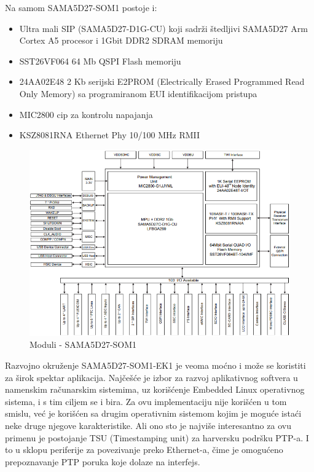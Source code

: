 \documentclass[a4paper,12pt, master]{etf}
\begin{document}
	Na samom SAMA5D27-SOM1 postoje i:
	\begin{itemize}
		\item Ultra mali SIP (SAMA5D27-D1G-CU) koji sadr\v{z}i \v{s}tedljivi 
		SAMA5D27 Arm Cortex A5 procesor i 1Gbit DDR2 SDRAM memoriju
		\item SST26VF064 64 Mb QSPI Flash memoriju
		\item 24AA02E48 2 Kb serijski E2PROM (Electrically Erased Programmed 
		Read Only Memory) sa programiranom EUI identifikacijom pristupa
		\item MIC2800 cip za kontrolu napajanja
		\item KSZ8081RNA Ethernet Phy 10/100 MHz RMII
	\end{itemize}

	\begin{figure}[htb]
			\centering
			\includegraphics[scale=.5]{../pic/hw_som_modules.PNG}
			\caption{Moduli - SAMA5D27-SOM1}
			\label{fig:hw_som_modules}
	\end{figure}

	Razvojno okru\v{z}enje SAMA5D27-SOM1-EK1 je veoma mo\'{c}no i mo\v{z}e se 
	koristiti za \v{s}irok spektar aplikacija. Naj\v{c}e\v{s}\'{c}e je izbor za 
	razvoj aplikativnog softvera u namenskim ra\v{c}unarskim sistemima, uz 
	kori\v{s}\'{c}enje Embedded Linux operativnog sistema, i s tim ciljem se i 
	bira. Za ovu implementaciju nije kori\v{s}\'{c}en u tom smislu,	ve\'{c} je 
	kori\v{s}\'{c}en sa drugim operativnim sistemom kojim je mogu\'{c}e 
	ista\'{c}i neke druge njegove karakteristike. Ali ono sto je najvi\v{s}e 
	interesantno za ovu primenu je postojanje TSU (Timestamping unit) za 
	harversku podr\v{s}ku PTP-a. I to u sklopu periferije za povezivanje preko 
	Ethernet-a, \v{c}ime je omogu\'{c}eno prepoznavanje PTP poruka koje dolaze
	na interfejs.
\end{document}
